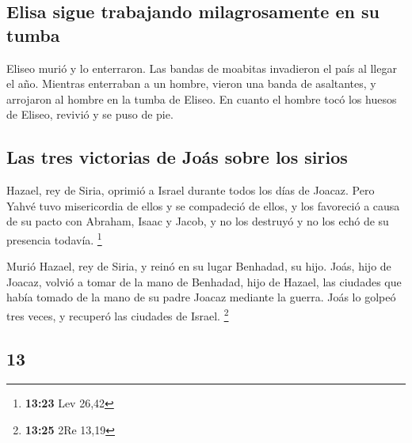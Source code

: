 \begin{paracol}{2}
\hypertarget{elisa-sigue-trabajando-milagrosamente-en-su-tumba}{%
\subsection{Elisa sigue trabajando milagrosamente en su
tumba}\label{elisa-sigue-trabajando-milagrosamente-en-su-tumba}}

 Eliseo murió y lo enterraron. Las bandas de moabitas
invadieron el país al llegar el año.  Mientras enterraban
a un hombre, vieron una banda de asaltantes, y arrojaron al hombre en la
tumba de Eliseo. En cuanto el hombre tocó los huesos de Eliseo, revivió
y se puso de pie.

\hypertarget{las-tres-victorias-de-jouxe1s-sobre-los-sirios}{%
\subsection{Las tres victorias de Joás sobre los
sirios}\label{las-tres-victorias-de-jouxe1s-sobre-los-sirios}}

 Hazael, rey de Siria, oprimió a Israel durante todos los
días de Joacaz.  Pero Yahvé tuvo misericordia de ellos y
se compadeció de ellos, y los favoreció a causa de su pacto con Abraham,
Isaac y Jacob, y no los destruyó y no los echó de su presencia todavía.
\footnote{\textbf{13:23} Lev 26,42}

 Murió Hazael, rey de Siria, y reinó en su lugar
Benhadad, su hijo.  Joás, hijo de Joacaz, volvió a tomar
de la mano de Benhadad, hijo de Hazael, las ciudades que había tomado de
la mano de su padre Joacaz mediante la guerra. Joás lo golpeó tres
veces, y recuperó las ciudades de Israel. \footnote{\textbf{13:25} 2Re
  13,19}

\switchcolumn
\begin{otherlanguage}{english}

\hypertarget{section-25}{%
\section{13}\label{section-25}}


\end{otherlanguage}
\end{paracol}
